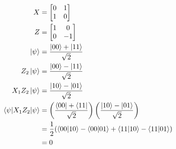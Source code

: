 \documentclass{article}
\begin{document}
\begin{align*}
  X                              & = \begin{bmatrix}
                                       0 & 1 \\
                                       1 & 0
                                     \end{bmatrix}                                                                                          \\
  Z                              & = \begin{bmatrix}
                                       1 & 0  \\
                                       0 & -1
                                     \end{bmatrix}                                                                                          \\
  \ket{\psi}                     & = \frac{\ket{00} + \ket{11}}{\sqrt{2}}                                                                    \\
  Z_2 \ket{\psi}                 & = \frac{\ket{00} - \ket{11}}{\sqrt{2}}                                                                    \\
  X_1 Z_2 \ket{\psi}             & = \frac{\ket{10} - \ket{01}}{\sqrt{2}}                                                                    \\
  \braket{\psi | X_1 Z_2 | \psi} & = \left( \frac{\bra{00} + \bra{11}}{\sqrt{2}} \right) \left( \frac{\ket{10} - \ket{01}}{\sqrt{2}} \right) \\
                                 & = \frac{1}{2} (\braket{00 | 10} - \braket{00 | 01} + \braket{11 | 10} - \braket{11 | 01})                 \\
                                 & = 0
\end{align*}
\end{document}
